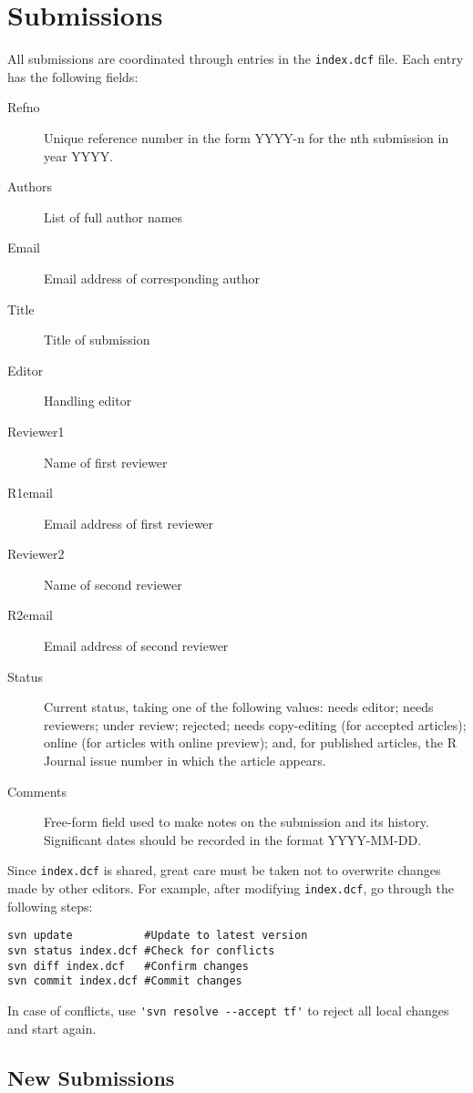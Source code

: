 \documentclass[11pt]{article}
\begin{document}
\section{Submissions}

All submissions are coordinated through entries in the \texttt{index.dcf}
file. Each entry has the following fields:
\begin{description}
\item[Refno] Unique reference number in the form YYYY-n for the nth
  submission in year YYYY.
\item[Authors] List of full author names
\item[Email] Email address of corresponding author
\item[Title] Title of submission
\item[Editor] Handling editor
\item[Reviewer1] Name of first reviewer
\item[R1email] Email address of first reviewer
\item[Reviewer2] Name of second reviewer
\item[R2email] Email address of second reviewer
\item[Status] Current status, taking one of the following values:
  needs editor; needs reviewers; under review; rejected; needs
  copy-editing (for accepted articles); online (for articles with
  online preview); and, for published articles, the R Journal issue
  number in which the article appears.
\item[Comments] Free-form field used to make notes on the submission and
  its history. Significant dates should be recorded in the format
  YYYY-MM-DD.
\end{description}

Since \texttt{index.dcf} is shared, great care must be taken not to
overwrite changes made by other editors. For example, after modifying
\texttt{index.dcf}, go through the following steps:

\begin{verbatim}
svn update           #Update to latest version
svn status index.dcf #Check for conflicts
svn diff index.dcf   #Confirm changes
svn commit index.dcf #Commit changes
\end{verbatim}

In case of conflicts, use \verb+'svn resolve --accept tf'+ to reject
all local changes and start again.

\subsection{New Submissions}
\end{document}
